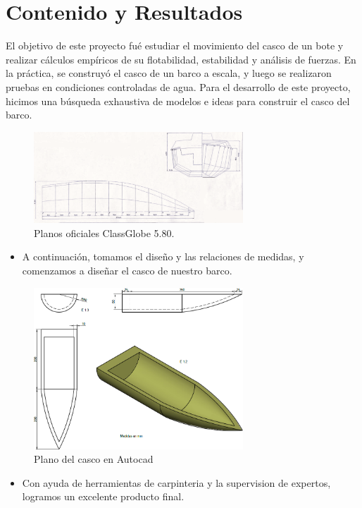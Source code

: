 \documentclass[letterpaper]{article}
\begin{document}
\section{Contenido y Resultados}
El objetivo de este proyecto fué estudiar el movimiento del casco de un bote y realizar cálculos empíricos
de su flotabilidad, estabilidad y análisis de fuerzas. En la práctica, se construyó el casco de un barco 
a escala, y luego se realizaron pruebas en condiciones controladas de agua.
Para el desarrollo de este proyecto, hicimos una búsqueda exhaustiva de modelos e ideas para construir el casco del barco.
\begin{figure}[H]
	\centering
	\includegraphics[width=0.7\textwidth]{planosbarc.png}
	\caption{ Planos oficiales ClassGlobe 5.80.}
	\label{fig:imagen}
\end{figure}
\begin{itemize}
	\item A continuación, tomamos el diseño y las relaciones de medidas, y comenzamos a diseñar el casco de nuestro barco.
\end{itemize}
\begin{figure}[H]
	\centering
	\includegraphics[width=0.7\textwidth]{Cascobarco.png}
	\caption{Plano del casco en Autocad}
	\label{fig:imagen1}
\end{figure}
\begin{itemize}
	\item Con ayuda de herramientas de carpinteria y la supervision de expertos, logramos un excelente producto final.
\end{itemize}
\end{document}
